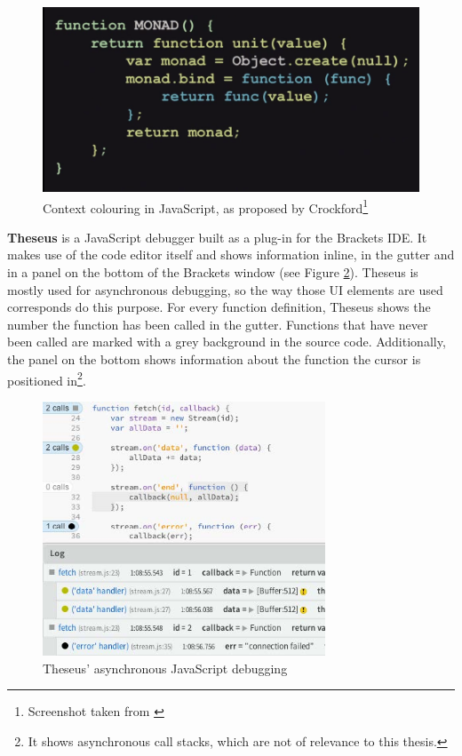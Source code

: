 \begin{figure}[htbp]
\centering
\includegraphics[keepaspectratio,width=\textwidth,height=0.75\textheight]{img/context.png}
\caption{Context colouring in JavaScript, as proposed by Crockford\footnote{Screenshot taken from \cite{crockford}}}
\label{fig:contexthighlighting}
\end{figure}

\textbf{Theseus} is a JavaScript debugger built as a plug-in for the
Brackets IDE. It makes use of the code editor itself and shows
information inline, in the gutter and in a panel on the bottom of the
Brackets window (see Figure \ref{fig:theseus}). Theseus is mostly used
for asynchronous debugging, so the way those UI elements are used
corresponds do this purpose. For every function definition, Theseus
shows the number the function has been called in the gutter. Functions
that have never been called are marked with a grey background in the
source code. Additionally, the panel on the bottom shows information
about the function the cursor is positioned in\footnote{It shows
  asynchronous call stacks, which are not of relevance to this thesis.}.

\begin{figure}[htbp]
\centering
\includegraphics[keepaspectratio,width=0.75\textwidth,height=0.75\textheight]{img/theseus.jpg}
\caption{Theseus’ asynchronous JavaScript debugging \cite{lieber}}
\label{fig:theseus}
\end{figure}

